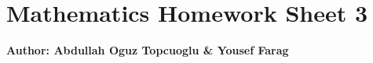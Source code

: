 \documentclass{article}
\begin{document}
\section*{\huge Mathematics Homework Sheet 3}
\begin{flushright}
   \textbf{Author: Abdullah Oguz Topcuoglu \& Yousef Farag}
\end{flushright}
\end{document}
